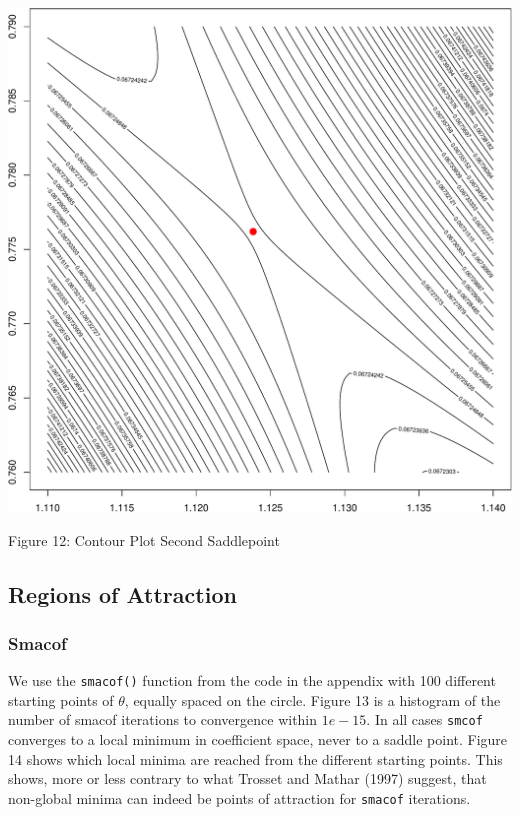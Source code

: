 \documentclass[
  12pt,
]{article}
\begin{document}
\begin{center}\includegraphics{twoPoints_files/figure-latex/contour_second_saddlepoint-1} \end{center}

Figure 12: Contour Plot Second Saddlepoint

\subsection{Regions of Attraction}\label{regions-of-attraction}

\subsubsection{Smacof}\label{smacof}

We use the \texttt{smacof()} function from the code in the appendix with 100 different starting points of \(\theta\), equally spaced on the circle. Figure 13 is a histogram of the number of smacof iterations to convergence within \(1e-15\). In all cases \texttt{smcof} converges to a local minimum in coefficient space, never to a saddle point. Figure 14 shows which local minima are reached from the different starting points. This shows, more or less contrary to what Trosset and Mathar (1997) suggest, that non-global minima can indeed be points of attraction for \texttt{smacof} iterations.
\end{document}
